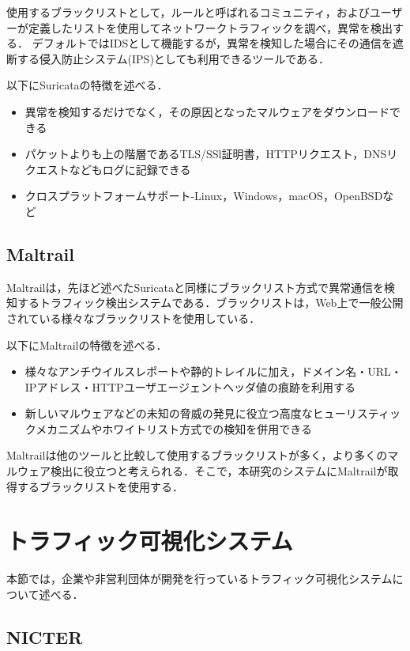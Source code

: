 \documentclass{thesis}
\begin{document}
使用するブラックリストとして，ルールと呼ばれるコミュニティ，およびユーザーが定義したリストを使用してネットワークトラフィックを調べ，異常を検出する．
デフォルトではIDSとして機能するが，異常を検知した場合にその通信を遮断する侵入防止システム(IPS)としても利用できるツールである．

以下にSuricataの特徴を述べる．

\begin{itemize}
\item 異常を検知するだけでなく，その原因となったマルウェアをダウンロードできる
\item パケットよりも上の階層であるTLS/SSl証明書，HTTPリクエスト，DNSリクエストなどもログに記録できる
\item クロスプラットフォームサポート-Linux，Windows，macOS，OpenBSDなど
\end{itemize}


\subsection*{Maltrail} \label{sec:Maltrail}

Maltrail\cite{Maltrail}は，先ほど述べたSuricataと同様にブラックリスト方式で異常通信を検知するトラフィック検出システムである．ブラックリストは，Web上で一般公開されている様々なブラックリストを使用している．

以下にMaltrailの特徴を述べる．

\begin{itemize}
\item 様々なアンチウイルスレポートや静的トレイルに加え，ドメイン名・URL・IPアドレス・HTTPユーザエージェントヘッダ値の痕跡を利用する
\item 新しいマルウェアなどの未知の脅威の発見に役立つ高度なヒューリスティックメカニズムやホワイトリスト方式での検知を併用できる
\end{itemize}

Maltrailは他のツールと比較して使用するブラックリストが多く，より多くのマルウェア検出に役立つと考えられる．そこで，本研究のシステムにMaltrailが取得するブラックリストを使用する．

\section{トラフィック可視化システム}

本節では，企業や非営利団体が開発を行っているトラフィック可視化システムについて述べる．

\subsection*{NICTER} \label{sec:NICTER}
\end{document}
